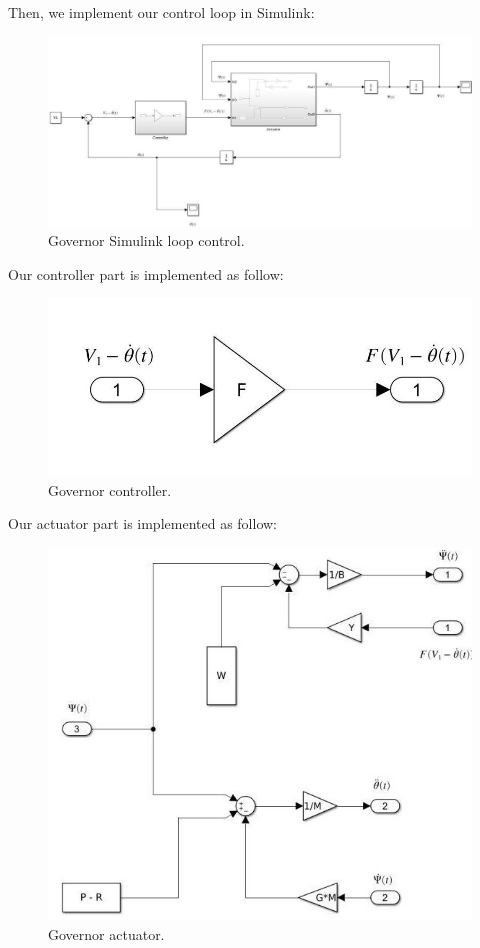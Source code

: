 \documentclass[11pt]{scrartcl} %
\begin{document}
\newline Then, we implement our control loop in Simulink:
\begin{figure}[h] 
	\centering
	\includegraphics[width=1\columnwidth]{images/p7.jpg}
	\caption{Governor Simulink loop control.}
\end{figure}\newpage 

Our controller part is implemented as follow:
\begin{figure}[h] 
	\centering
	\includegraphics[width=0.7\columnwidth]{images/p8.jpg}
	\caption{Governor controller.}
\end{figure} 
\newline Our actuator part is implemented as follow:
\begin{figure}[h] 
	\centering
	\includegraphics[width=0.8\columnwidth]{images/p9.jpg}
	\caption{Governor actuator.}
\end{figure} 
\newpage
\end{document}

